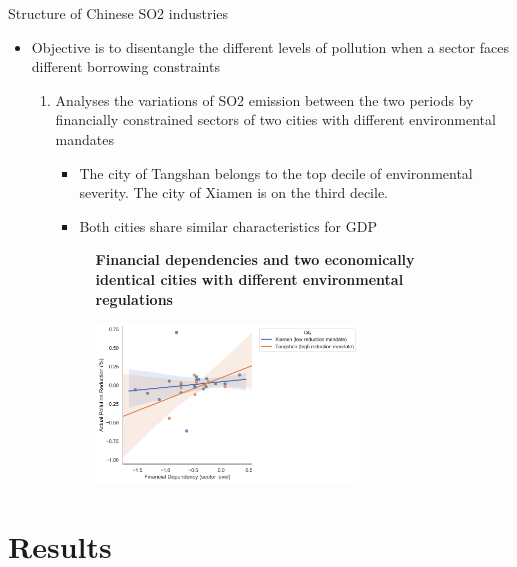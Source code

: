\documentclass{beamer}
\begin{document}
\begin{framefont}{\small}{\scriptsize}{\scriptsize}
    \begin{frame}{Structure of Chinese SO2 industries}
        \begin{itemize}
            \item Objective is to disentangle the different levels of pollution when a sector faces different borrowing constraints
            \begin{enumerate}
                \item Analyses the variations of SO2 emission between the two periods by financially constrained sectors of two cities with different environmental mandates
                \begin{itemize}
                    \item The city of Tangshan belongs to the top decile of environmental severity. The city of Xiamen is on the third decile. 
                    \item Both cities share similar characteristics for GDP
                \end{itemize}
                \begin{figure}[ht]
                    \centering
                    \textbf{Financial dependencies and two economically identical cities with different environmental regulations}\par\medskip
                    \includegraphics[width=0.7\textwidth]{fig_4}
                \end{figure}
            \end{enumerate}
        \end{itemize}
\end{frame}
\end{framefont}

\section{Results}
\end{document}
